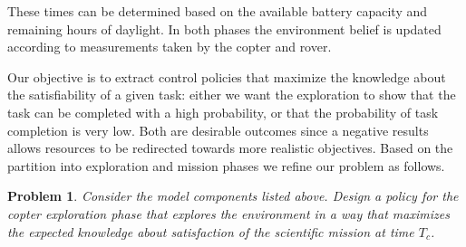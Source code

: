 \documentclass[conference]{IEEEtran}
\newtheorem{problem}{Problem}
\begin{document}
These times can be determined based on the available battery capacity and remaining hours of daylight. In both phases the environment belief is updated according to measurements taken by the copter and rover.  \\

 
Our objective is to extract control policies that maximize the knowledge about the satisfiability of a given task: either we want the exploration to show that the task can be completed with a high probability, or that the probability of task completion is very low. Both are desirable outcomes since a negative results allows resources to be redirected towards more realistic objectives. Based on the partition into exploration and mission phases we refine our problem as follows.
\begin{problem}
\label{prob:main}
  Consider the model components listed above. Design a policy for the copter exploration phase that explores the environment in a way that maximizes the expected knowledge about satisfaction of the scientific mission at time $T_c$.
\end{problem}



\end{document}
